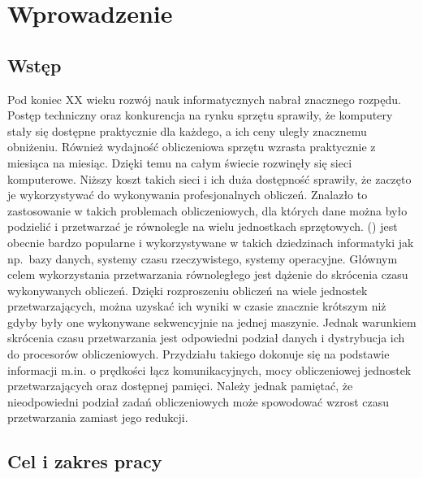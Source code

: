 \chapter{Wprowadzenie}

\section{Wstęp}

Pod koniec XX wieku rozwój nauk informatycznych nabrał znacznego rozpędu. Postęp techniczny oraz konkurencja na rynku sprzętu sprawiły, że 
komputery stały się dostępne praktycznie dla każdego, a ich ceny uległy znacznemu obniżeniu. Również wydajność obliczeniowa sprzętu wzrasta praktycznie 
z miesiąca na miesiąc. Dzięki temu na całym świecie rozwinęły się sieci komputerowe. Niższy koszt takich sieci i ich duża dostępność sprawiły, że 
zaczęto je wykorzystywać do wykonywania profesjonalnych obliczeń. Znalazło to zastosowanie w takich problemach obliczeniowych, dla których dane 
można było podzielić i przetwarzać je równolegle na wielu jednostkach sprzętowych.  () 
jest obecnie bardzo popularne i wykorzystywane w takich dziedzinach informatyki jak np.~bazy danych, systemy czasu rzeczywistego, systemy operacyjne. 
Głównym celem wykorzystania przetwarzania równoległego jest dążenie do skrócenia czasu wykonywanych obliczeń. Dzięki rozproszeniu obliczeń 
na wiele jednostek przetwarzających, można uzyskać ich wyniki w czasie znacznie krótszym niż gdyby były one wykonywane sekwencyjnie na 
jednej maszynie. Jednak warunkiem skrócenia czasu przetwarzania jest odpowiedni podział danych i dystrybucja ich do procesorów obliczeniowych. 
Przydziału takiego dokonuje się na podstawie informacji m.in. o prędkości łącz komunikacyjnych, mocy obliczeniowej jednostek przetwarzających oraz dostępnej 
pamięci. Należy jednak pamiętać, że nieodpowiedni podział zadań obliczeniowych może spowodować wzrost czasu przetwarzania zamiast jego redukcji.

\section{Cel i zakres pracy}

